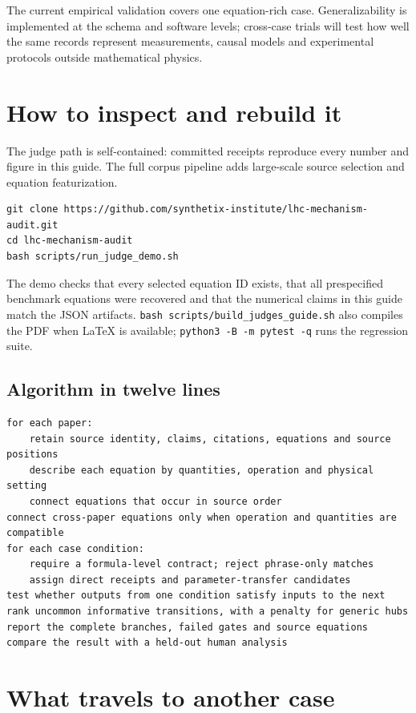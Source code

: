 \documentclass[10pt]{article}
\begin{document}
The current empirical validation covers one equation-rich case. Generalizability is implemented at the schema and software levels; cross-case trials will test how well the same records represent measurements, causal models and experimental protocols outside mathematical physics.

\section{How to inspect and rebuild it}

The judge path is self-contained: committed receipts reproduce every number and figure in this guide. The full corpus pipeline adds large-scale source selection and equation featurization.

\begin{verbatim}
git clone https://github.com/synthetix-institute/lhc-mechanism-audit.git
cd lhc-mechanism-audit
bash scripts/run_judge_demo.sh
\end{verbatim}

The demo checks that every selected equation ID exists, that all prespecified benchmark equations were recovered and that the numerical claims in this guide match the JSON artifacts. \texttt{bash scripts/build\_judges\_guide.sh} also compiles the PDF when LaTeX is available; \texttt{python3 -B -m pytest -q} runs the regression suite.

\subsection*{Algorithm in twelve lines}
\begin{verbatim}
for each paper:
    retain source identity, claims, citations, equations and source positions
    describe each equation by quantities, operation and physical setting
    connect equations that occur in source order
connect cross-paper equations only when operation and quantities are compatible
for each case condition:
    require a formula-level contract; reject phrase-only matches
    assign direct receipts and parameter-transfer candidates
test whether outputs from one condition satisfy inputs to the next
rank uncommon informative transitions, with a penalty for generic hubs
report the complete branches, failed gates and source equations
compare the result with a held-out human analysis
\end{verbatim}

\section{What travels to another case}
\end{document}
